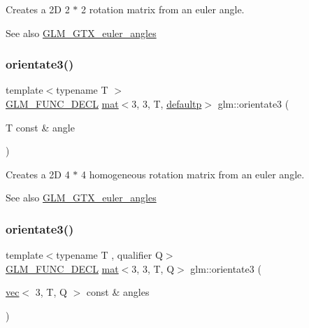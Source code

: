 Creates a 2D 2 $\ast$ 2 rotation matrix from an euler angle. \begin{DoxySeeAlso}{See also}
\hyperlink{group__gtx__euler__angles}{G\+L\+M\+\_\+\+G\+T\+X\+\_\+euler\+\_\+angles} 
\end{DoxySeeAlso}
\mbox{\label{group__gtx__euler__angles_ga7ca98668a5786f19c7b38299ebbc9b4c}} 
\subsubsection{\texorpdfstring{orientate3()}{orientate3()}\hspace{0.1cm}{\footnotesize\ttfamily [1/2]}}
{\footnotesize\ttfamily template$<$typename T $>$ \\
\hyperlink{setup_8hpp_ab2d052de21a70539923e9bcbf6e83a51}{G\+L\+M\+\_\+\+F\+U\+N\+C\+\_\+\+D\+E\+CL} \hyperlink{structglm_1_1mat}{mat}$<$3, 3, T, \hyperlink{namespaceglm_a36ed105b07c7746804d7fdc7cc90ff25a9d21ccd8b5a009ec7eb7677befc3bf51}{defaultp}$>$ glm\+::orientate3 (\begin{DoxyParamCaption}\item[{T const \&}]{angle }\end{DoxyParamCaption})}

Creates a 2D 4 $\ast$ 4 homogeneous rotation matrix from an euler angle. \begin{DoxySeeAlso}{See also}
\hyperlink{group__gtx__euler__angles}{G\+L\+M\+\_\+\+G\+T\+X\+\_\+euler\+\_\+angles} 
\end{DoxySeeAlso}
\mbox{\label{group__gtx__euler__angles_ga7238c8e15c7720e3ca6a45ab151eeabb}} 
\subsubsection{\texorpdfstring{orientate3()}{orientate3()}\hspace{0.1cm}{\footnotesize\ttfamily [2/2]}}
{\footnotesize\ttfamily template$<$typename T , qualifier Q$>$ \\
\hyperlink{setup_8hpp_ab2d052de21a70539923e9bcbf6e83a51}{G\+L\+M\+\_\+\+F\+U\+N\+C\+\_\+\+D\+E\+CL} \hyperlink{structglm_1_1mat}{mat}$<$3, 3, T, Q$>$ glm\+::orientate3 (\begin{DoxyParamCaption}\item[{\hyperlink{structglm_1_1vec}{vec}$<$ 3, T, Q $>$ const \&}]{angles }\end{DoxyParamCaption})}

